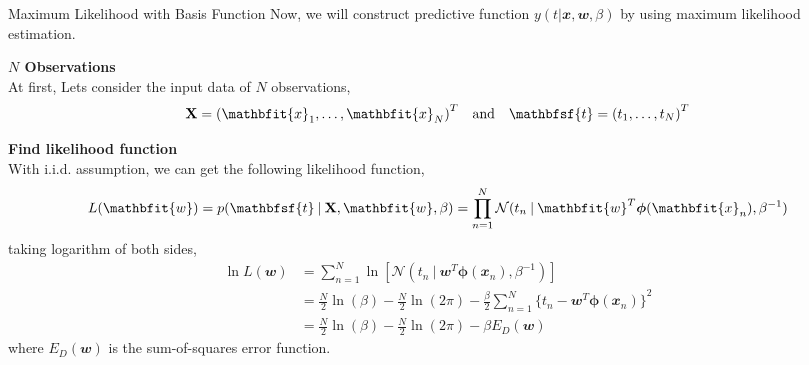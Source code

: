 \documentclass{bredelebeamer}
\begin{document}
\begin{frame}{Maximum Likelihood with Basis Function}
  Now, we will construct predictive function $y(t| \mathbfit{x}, \mathbfit{w}, \beta)$
  by using maximum likelihood estimation.

  \vspace{0.5\baselineskip}
  \textbf{$N$ Observations}\\
  At first, Lets consider the input data
  of $N$ observations,
  \begin{equation}
    \mathbf{X} = {(\mathbfit{x}_1, \ldots, \mathbfit{x}_N)}^T
    \quad \textrm{and} \quad
    \mathbfsf{t} = {(t_1, \ldots, t_N)}^T
  \end{equation}

  \textbf{Find likelihood function}\\
  With \textrm{i.i.d.} assumption, we can get the following likelihood function,
  \begin{equation}
    L(\mathbfit{w}) = p(\mathbfsf{t} \:|\: \mathbf{X}, \mathbfit{w}, \beta)
    =\prod_{n=1}^{N} \mathcal{N} (t_n \:|\: \mathbfit{w}^T \boldsymbol{\phi} (\mathbfit{x}_n), \beta^{-1})
  \end{equation}
  taking logarithm of both sides,
  \begin{equation}
    \begin{split}
      \ln L(\mathbfit{w})
      &= \sum_{n=1}^{N} \ln [\mathcal{N} (t_n \:|\: \mathbfit{w}^T \boldsymbol{\phi} (\mathbfit{x}_n), \beta^{-1})] \\
      &= \frac{N}{2}\ln(\beta) - \frac{N}{2}\ln(2\pi)
        -\frac{\beta}{2} \sum_{n=1}^{N} {\{t_n - \mathbfit{w}^T \boldsymbol{\phi} (\mathbfit{x}_n)\}}^2 \\
      &= \frac{N}{2}\ln(\beta) - \frac{N}{2}\ln(2\pi) -\beta E_{D}(\mathbfit{w})
    \end{split}
  \end{equation}
  where $E_{D}(\mathbfit{w})$ is the sum-of-squares error function.
\end{frame}
\end{document}
